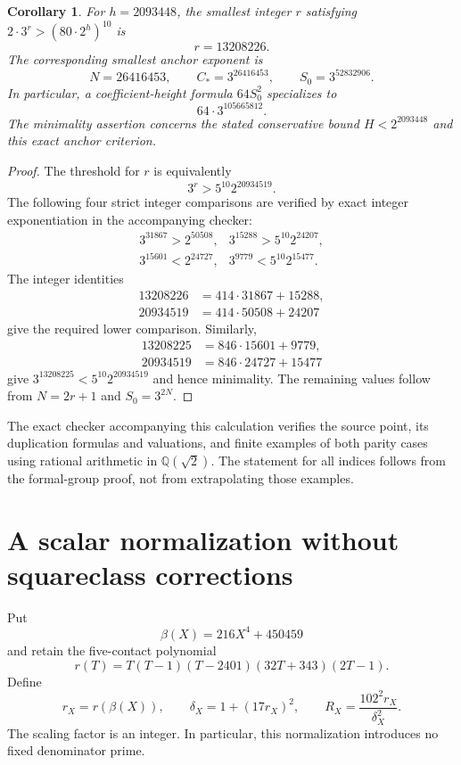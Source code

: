 \documentclass[11pt,a4paper]{article}
\newtheorem{corollary}[theorem]{Corollary}
\theoremstyle{definition}
\theoremstyle{remark}
\begin{document}
\begin{corollary}\label{anchor3:numerical-constant}
For $h=2093448$, the smallest integer $r$ satisfying
$2\cdot3^r>(80\cdot2^h)^{10}$ is
\[
                         r=13208226.
\]
The corresponding smallest anchor exponent is
\[
 N=26416453,\qquad C_*=3^{26416453},\qquad
 S_0=3^{52832906}.
\]
In particular, a coefficient-height formula $64S_0^2$ specializes to
\[
                              64\cdot3^{105665812}.
\]
The minimality assertion concerns the stated conservative bound
$H<2^{2093448}$ and this exact anchor criterion.
\end{corollary}
\begin{proof}
The threshold for $r$ is equivalently
\[
                     3^r>5^{10}2^{20934519}.
\]
The following four strict integer comparisons are verified by exact
integer exponentiation in the accompanying checker:
\[
 \begin{array}{ll}
 3^{31867}>2^{50508},&
 3^{15288}>5^{10}2^{24207},\\
 3^{15601}<2^{24727},&
 3^{9779}<5^{10}2^{15477}.
 \end{array}
\]
The integer identities
\[
 \begin{split}
 13208226&=414\cdot31867+15288,\\
 20934519&=414\cdot50508+24207
 \end{split}
\]
give the required lower comparison.  Similarly,
\[
 \begin{split}
 13208225&=846\cdot15601+9779,\\
 20934519&=846\cdot24727+15477
 \end{split}
\]
give $3^{13208225}<5^{10}2^{20934519}$ and hence minimality.
The remaining values follow from $N=2r+1$ and $S_0=3^{2N}$.
\end{proof}

The exact checker accompanying this calculation verifies the source
point, its duplication formulas and valuations, and finite examples of
both parity cases using rational arithmetic in $\mathbb Q(\sqrt2)$.
The statement for all indices follows from the formal-group proof,
not from extrapolating those examples.


\section{A scalar normalization without squareclass corrections}
\label{sec:scalar-correction-free}

Put
\[
                         \beta(X)=216X^4+450459
\]
and retain the five-contact polynomial
\[
 r(T)=T(T-1)(T-2401)(32T+343)(2T-1).
\]
Define
\[
 r_X=r(\beta(X)),\qquad
 \delta_X=1+(17r_X)^2,\qquad
 R_X=\frac{102^2r_X}{\delta_X^2}.
\]
The scaling factor is an integer.  In particular, this normalization
introduces no fixed denominator prime.
\end{document}
